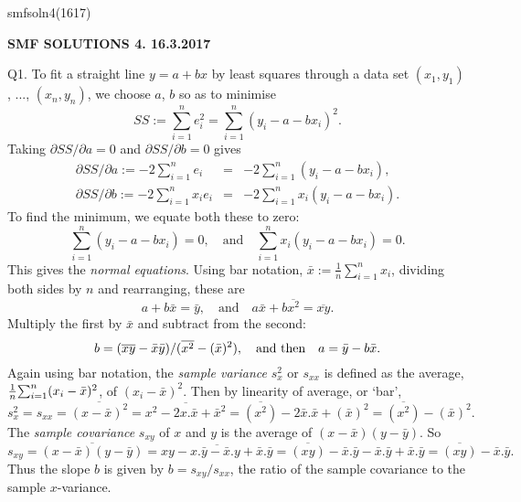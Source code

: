 \documentclass{article}
\begin{document}
\def\ni{\noindent}
\def\i{\indent}
\def\G{\Gamma}
\def\s{\sigma}
\def\t{\theta}
\def\z{\zeta}
\def\p{\partial}
\def\half{\frac{1}{2}}
\def\qq{\qquad}
\def\b{\beta}
\def\e{\epsilon}
\ni smfsoln4(1617)
\begin{center}
{\bf SMF SOLUTIONS 4.  16.3.2017}
\end{center}

\ni Q1. To fit a straight line $y = a + bx$
by least squares through a data set $(x_1,y_1)$, ..., $(x_n,y_n)$,
we choose $a$, $b$ so as to minimise
\[
SS := {\sum}_{i=1}^n e_i^2 = {\sum}_{i=1}^n (y_i - a - b x_i)^2.
\]
Taking $\partial SS/\partial a = 0$ and $\partial SS/\partial b = 0$ gives
\begin{eqnarray*}
\partial SS/\partial a := -2 {\sum}_{i=1}^n e_i
&=& -2 {\sum}_{i=1}^n (y_i - a - b x_i),\\
\partial SS/\partial b := -2 {\sum}_{i=1}^n x_i e_i
&=& -2 {\sum}_{i=1}^n x_i(y_i - a - b x_i).
\end{eqnarray*}
To find the minimum, we equate both these to zero:
\[
{\sum}_{i=1}^n (y_i - a - b x_i) = 0,
\quad\mbox{and}\quad
{\sum}_{i=1}^n x_i(y_i - a - b x_i) = 0.
\]
This gives the {\it  normal equations}.  Using bar notation,
$\bar x := \frac{1}{n} {\sum}_{i=1}^n x_i$, dividing both sides by
$n$ and rearranging, these are
\[
a + b \bar x = \bar y,
\quad\mbox{and}\quad
a \bar x + b \overline{x^2} = \overline{xy}.
\]
Multiply the first by $\bar x$ and subtract from the second:
$$
b = (\overline{xy} - \bar x \bar y)/(\overline{x^2} - (\bar x)^2),
\quad \hbox{and then} \quad
a = \bar y - b \bar x.
$$
Again using bar notation, the {\it  sample
variance} $s_x^2$ or $s_{xx}$ is defined as the average, ${1
\over n} {\sum}_{i=1}^n (x_i - \bar x)^2$, of $(x_i - \bar x)^2$.  Then by linearity of average, or `bar',
\[
s_x^2 = s_{xx} = \overline{(x - \bar x)^2} = \overline{x^2 -
2x.\bar x + {\bar x}^2} = \overline{(x^2)} - 2\bar x.\bar x +
(\bar x)^2= \overline{(x^2)} - (\bar x)^2.
\]
The {\it  sample covariance} $s_{xy}$ of $x$ and $y$ is the average of $(x - \bar x)(y - \bar y)$. So
\[
s_{xy} = \overline{(x - \bar x)(y - \bar y)} = \overline{xy -
x.\bar y - \bar x.y + {\bar x}.{\bar y}} = \overline{(xy)} - \bar
x.\bar y - \bar x.\bar y + {\bar x}.{\bar y} = \overline{(xy)} -
\bar x.\bar y.
\]
Thus the slope $b$ is given by $b = s_{xy}/s_{xx}$, the ratio of the sample covariance to the sample $x$-variance.\\
\end{document}
